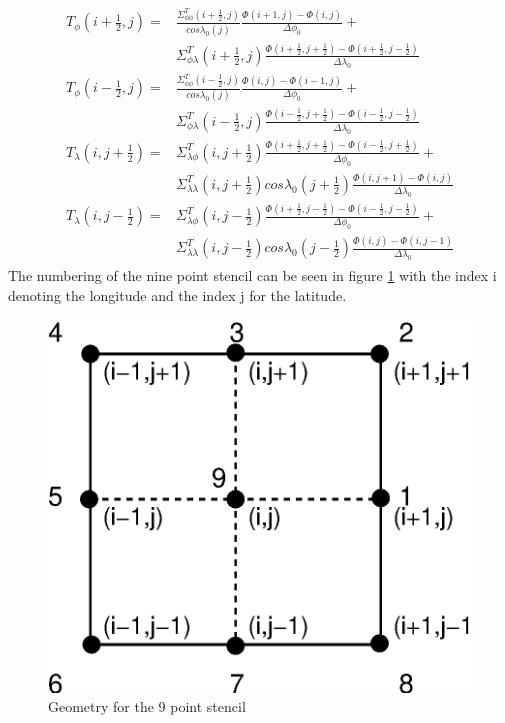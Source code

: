 \begin{align}
\begin{split}
 T_{\phi}(i+\frac{1}{2},j)=&  \frac{\Sigma_{\phi \phi}^T(i+\frac{1}{2},j)}{cos
   \lambda_0(j)} \frac{ \Phi(i+1,j)- \Phi(i,j)}{\Delta \phi_0} + \\
   &\Sigma_{\phi \lambda}^T(i+\frac{1}{2},j) 
   \frac{ \Phi(i+\frac{1}{2},j+\frac{1}{2})-\Phi(i+\frac{1}{2},j-\frac{1}{2})}{\Delta \lambda_0}  \\
 T_{\phi}(i-\frac{1}{2},j)=&  \frac{\Sigma_{\phi \phi}^T(i-\frac{1}{2},j)}{cos
   \lambda_0(j)} \frac{ \Phi(i,j)- \Phi(i-1,j)}{\Delta \phi_0} + \\
   &\Sigma_{\phi \lambda}^T(i-\frac{1}{2},j) 
   \frac{ \Phi(i-\frac{1}{2},j+\frac{1}{2})-\Phi(i-\frac{1}{2},j-\frac{1}{2})}{\Delta \lambda_0}  \\
 T_{\lambda}(i,j+\frac{1}{2})=& \Sigma_{\lambda \phi}^T(i,j+\frac{1}{2})
    \frac{ \Phi(i+\frac{1}{2},j+\frac{1}{2})- \Phi(i-\frac{1}{2},j+\frac{1}{2})}{\Delta \phi_0} +\\
   &\Sigma_{\lambda \lambda}^T(i,j+\frac{1}{2}) cos \lambda_0(j+\frac{1}{2}) 
   \frac{ \Phi(i,j+1)-\Phi(i,j)}{\Delta \lambda_0}  \\
 T_{\lambda}(i,j-\frac{1}{2})=& \Sigma_{\lambda \phi}^T(i,j-\frac{1}{2})
    \frac{ \Phi(i+\frac{1}{2},j-\frac{1}{2})- \Phi(i-\frac{1}{2},j-\frac{1}{2})}{\Delta \phi_0} +\\ 
   &\Sigma_{\lambda \lambda}^T(i,j-\frac{1}{2}) cos \lambda_0(j-\frac{1}{2}) 
   \frac{ \Phi(i,j)-\Phi(i,j-1)}{\Delta \lambda_0} 
\end{split}
\end{align}
%
The numbering of the nine point stencil can be seen in figure \ref{fig:stencil}
with the index i denoting the longitude and the index j for the latitude.
%
\begin{figure}
  \centering
  \includegraphics[scale=0.5]{./tex_plot/stencil.eps}
  \caption{Geometry for the 9 point stencil}
   \label{fig:stencil}
\end{figure}
